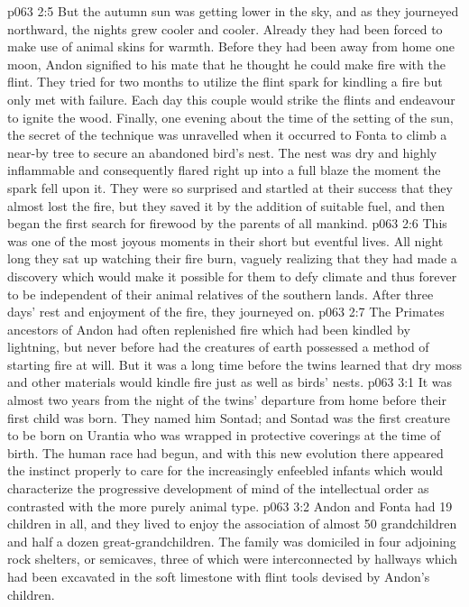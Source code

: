 \vs p063 2:5 But the autumn sun was getting lower in the sky, and as they journeyed northward, the nights grew cooler and cooler. Already they had been forced to make use of animal skins for warmth. Before they had been away from home one moon, Andon signified to his mate that he thought he could make fire with the flint. They tried for two months to utilize the flint spark for kindling a fire but only met with failure. Each day this couple would strike the flints and endeavour to ignite the wood. Finally, one evening about the time of the setting of the sun, the secret of the technique was unravelled when it occurred to Fonta to climb a near\hyp{}by tree to secure an abandoned bird’s nest. The nest was dry and highly inflammable and consequently flared right up into a full blaze the moment the spark fell upon it. They were so surprised and startled at their success that they almost lost the fire, but they saved it by the addition of suitable fuel, and then began the first search for firewood by the parents of all mankind.
\vs p063 2:6 This was one of the most joyous moments in their short but eventful lives. All night long they sat up watching their fire burn, vaguely realizing that they had made a discovery which would make it possible for them to defy climate and thus forever to be independent of their animal relatives of the southern lands. After three days’ rest and enjoyment of the fire, they journeyed on.
\vs p063 2:7 The Primates ancestors of Andon had often replenished fire which had been kindled by lightning, but never before had the creatures of earth possessed a method of starting fire at will. But it was a long time before the twins learned that dry moss and other materials would kindle fire just as well as birds’ nests.
\vs p063 3:1 It was almost two years from the night of the twins’ departure from home before their first child was born. They named him Sontad; and Sontad was the first creature to be born on Urantia who was wrapped in protective coverings at the time of birth. The human race had begun, and with this new evolution there appeared the instinct properly to care for the increasingly enfeebled infants which would characterize the progressive development of mind of the intellectual order as contrasted with the more purely animal type.
\vs p063 3:2 Andon and Fonta had 19 children in all, and they lived to enjoy the association of almost 50 grandchildren and half a dozen great\hyp{}grandchildren. The family was domiciled in four adjoining rock shelters, or semicaves, three of which were interconnected by hallways which had been excavated in the soft limestone with flint tools devised by Andon’s children.
